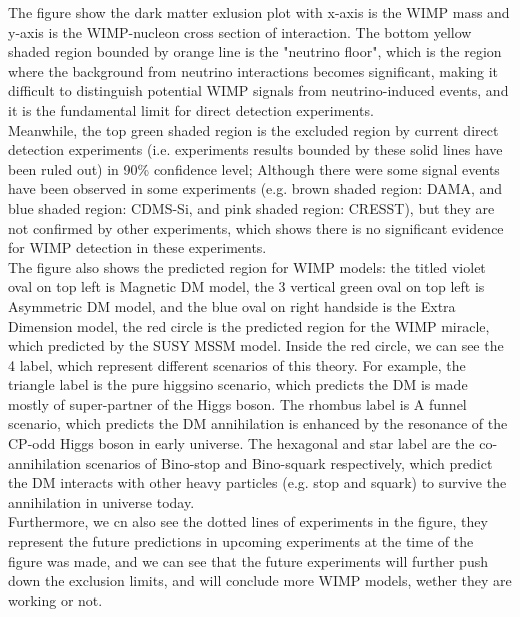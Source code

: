 \begin{extra}
    The figure show the dark matter exlusion plot with x-axis is the WIMP mass and y-axis is the WIMP-nucleon cross section of interaction. The bottom yellow shaded region bounded by orange line is the "neutrino floor", which is the region where the background from neutrino interactions becomes significant, making it difficult to distinguish potential WIMP signals from neutrino-induced events, and it is the fundamental limit for direct detection experiments. \\

    Meanwhile, the top green shaded region is the excluded region by current direct detection experiments (i.e. experiments results bounded by these solid lines have been ruled out) in 90\% confidence level; Although there were some signal events have been observed in some experiments (e.g. brown shaded region: DAMA, and blue shaded region: CDMS-Si, and pink shaded region: CRESST), but they are not confirmed by other experiments, which shows there is no significant evidence for WIMP detection in these experiments. \\

    The figure also shows the predicted region for WIMP models: the titled violet oval on top left is Magnetic DM model, the 3 vertical green oval on top left is Asymmetric DM model, and the blue oval on right handside is the Extra Dimension model, the red circle is the predicted region for the WIMP miracle, which predicted by the SUSY MSSM model. Inside the red circle, we can see the 4 label, which represent different scenarios of this theory. For example, the triangle label is the pure higgsino scenario, which predicts the DM is made mostly of super-partner of the Higgs boson. The rhombus label is A funnel scenario, which predicts the DM annihilation is enhanced by the resonance of the CP-odd Higgs boson in early universe. The hexagonal and star label are the co-annihilation scenarios of Bino-stop and Bino-squark respectively, which predict the DM interacts with other heavy particles (e.g. stop and squark) to survive the annihilation in universe today. \\

    Furthermore, we cn also see the dotted lines of experiments in the figure, they represent the future predictions in upcoming experiments at the time of the figure was made, and we can see that the future experiments will further push down the exclusion limits, and will conclude more WIMP models, wether they are working or not.
\end{extra}

